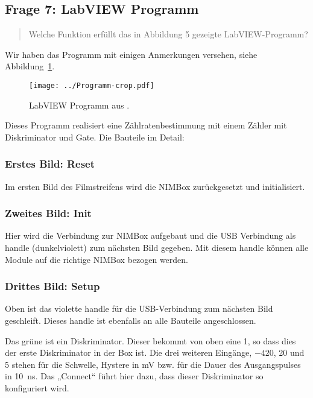 \documentclass[11pt, ngerman, fleqn, DIV=15, headinclude, BCOR=2cm]{scrreprt}
\begin{document}
\subsection{Frage 7: LabVIEW Programm}

\begin{quote}
    Welche Funktion erfüllt das in Abbildung 5 gezeigte LabVIEW-Programm?
\end{quote}

Wir haben das Programm mit einigen Anmerkungen versehen, siehe
Abbildung~\ref{fig:labview-test}.

\begin{figure}[htbp]
    \centering
    \texttt{[image: ../Programm-crop.pdf]}
    \caption{%
        LabVIEW Programm aus \parencite[Abbildung~5]{physik512-Anleitung}.
    }
    \label{fig:labview-test}
\end{figure}

Dieses Programm realisiert eine Zählratenbestimmung mit einem Zähler mit
Diskriminator und Gate. Die Bauteile im Detail:

\subsubsection{Erstes Bild: Reset}

Im ersten Bild des Filmstreifens wird die NIMBox zurückgesetzt und
initialisiert.

\subsubsection{Zweites Bild: Init}

Hier wird die Verbindung zur NIMBox aufgebaut und die USB Verbindung als handle
(dunkelviolett) zum nächsten Bild gegeben. Mit diesem handle können alle Module
auf die richtige NIMBox bezogen werden.

\subsubsection{Drittes Bild: Setup}

Oben ist das violette handle für die USB-Verbindung zum nächsten Bild
geschleift. Dieses handle ist ebenfalls an alle Bauteile angeschlossen.

Das grüne ist ein Diskriminator. Dieser bekommt von oben eine 1, so dass dies
der erste Diskriminator in der Box ist. Die drei weiteren Eingänge, $-420$, 20
und 5 stehen für die Schwelle, Hystere in \si{\milli\volt} bzw. für die Dauer
des Ausgangspulses in \SI{10}{\nano\second}. Das „Connect“ führt hier dazu,
dass dieser Diskriminator so konfiguriert wird.
\end{document}
